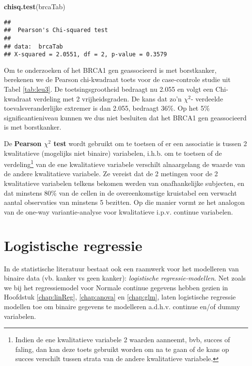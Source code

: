 \documentclass[12pt,dutch,coursenotes]{book}
\newenvironment{Shaded}{\begin{snugshade}}{\end{snugshade}}
\newcommand{\KeywordTok}[1]{\textcolor[rgb]{0.13,0.29,0.53}{\textbf{#1}}}
\newcommand{\NormalTok}[1]{#1}
\let\rmarkdownfootnote\footnote%
\def\footnote{\protect\rmarkdownfootnote}
\theoremstyle{definition}
\theoremstyle{definition}
\theoremstyle{definition}
\theoremstyle{remark}
\begin{document}
\begin{Shaded}
\begin{Highlighting}[]
\KeywordTok{chisq.test}\NormalTok{(brcaTab)}
\end{Highlighting}
\end{Shaded}

\begin{verbatim}
## 
##  Pearson's Chi-squared test
## 
## data:  brcaTab
## X-squared = 2.0551, df = 2, p-value = 0.3579
\end{verbatim}

Om te onderzoeken of het BRCA1 gen geassocieerd is met borstkanker,
berekenen we de Pearson chi-kwadraat toets voor de case-controle studie
uit Tabel \ref{tab:leu3}. De toetsingsgrootheid bedraagt nu 2.055 en
volgt een Chi-kwadraat verdeling met 2 vrijheidsgraden. De kans dat zo'n
\(\chi^2\)- verdeelde toevalsveranderlijke extremer is dan 2.055,
bedraagt 36\%. Op het 5\% significantieniveau kunnen we dus niet
besluiten dat het BRCA1 gen geassocieerd is met borstkanker.

De \textbf{Pearson \(\chi^2\) test} wordt gebruikt om te toetsen of er
een associatie is tussen 2 kwalitatieve (mogelijks niet binaire)
variabelen, i.h.b. om te toetsen of de verdeling\footnote{Indien de ene
  kwalitatieve variabele 2 waarden aanneemt, bvb, succes of faling, dan
  kan deze toets gebruikt worden om na te gaan of de kans op succes
  verschilt tussen strata van de andere kwalitatieve variabele.} van de
ene kwalitatieve variabele verschilt alnaargelang de waarde van de
andere kwalitatieve variabele. Ze vereist dat de 2 metingen voor de 2
kwalitatieve variabelen telkens bekomen werden van onafhankelijke
subjecten, en dat minstens 80\% van de cellen in de overeenkomstige
kruistabel een verwacht aantal observaties van minstens 5 bezitten. Op
die manier vormt ze het analogon van de one-way variantie-analyse voor
kwalitatieve i.p.v. continue variabelen.

\section{Logistische regressie}\label{logistische-regressie}

In de statistische literatuur bestaat ook een raamwerk voor het
modelleren van binaire data (vb. kanker vs geen kanker):
\emph{logistische regressie-modellen}. Net zoals we bij het
regressiemodel voor Normale continue gegevens hebben gezien in Hoofdstuk
\ref{chap:linReg}, \ref{chap:anova} en \ref{chap:glm}, laten logistische
regressie modellen toe om binaire gegevens te modelleren a.d.h.v.
continue en/of dummy variabelen.
\end{document}
